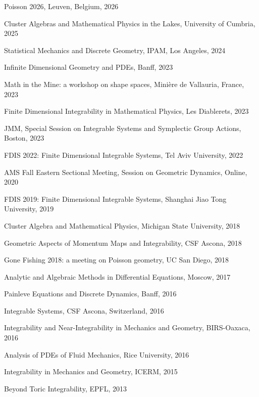 \documentclass[a4paper, 12pt]{article}
\begin{document}
\begin{compactitem}
\item Poisson 2026, Leuven, Belgium, 2026
\item Cluster Algebras and Mathematical Physics in the Lakes, University of Cumbria, 2025
\item Statistical Mechanics and Discrete Geometry, IPAM, Los Angeles, 2024
\item Infinite Dimensional Geometry and PDEs, Banff, 2023
\item Math in the Mine: a workshop on shape spaces, Mini\`{e}re de Vallauria, France, 2023
\item Finite Dimensional Integrability in Mathematical Physics, Les Diablerets, 2023
\item JMM, Special Session on Integrable Systems and Symplectic Group Actions, Boston, 2023
\item {FDIS 2022: Finite Dimensional Integrable Systems}, Tel Aviv University,  2022
\item {AMS Fall Eastern Sectional Meeting,  Session on Geometric Dynamics},  Online, 2020
\item {FDIS 2019: Finite Dimensional Integrable Systems}, Shanghai Jiao Tong University,  2019
\item   {Cluster Algebra and Mathematical Physics}, Michigan State University,  2018
\item  {Geometric Aspects of Momentum Maps and Integrability},  CSF Ascona,  2018
\item   {Gone Fishing 2018: a meeting on Poisson geometry}, UC San Diego,  2018
\item {Analytic and Algebraic Methods in Differential Equations}, Moscow,
 2017
\item{Painleve Equations and Discrete Dynamics}, Banff,  2016
\item{Integrable Systems},  CSF Ascona, Switzerland,  2016
\item{Integrability and Near-Integrability in Mechanics and Geometry}, BIRS-Oaxaca,  2016
\item {Analysis of PDEs of Fluid Mechanics}, Rice University,  2016
\item {Integrability in Mechanics and Geometry}, ICERM,  2015
\item  {Beyond Toric Integrability}, EPFL,  2013
\end{compactitem}  
\par\smallskip
\end{document}
